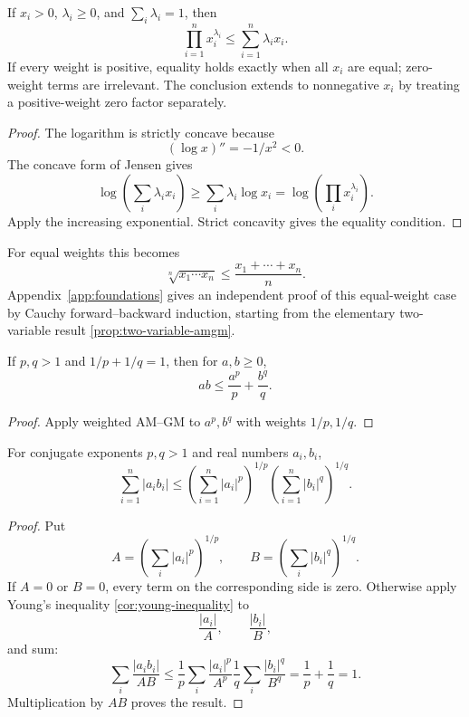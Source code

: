 \begin{corollary}
\label{cor:weighted-amgm}
If \(x_i>0\), \(\lambda_i\geq0\), and
\(\sum_i\lambda_i=1\), then
\[
\boxed{\prod_{i=1}^n x_i^{\lambda_i}
\leq\sum_{i=1}^n\lambda_i x_i.}
\]
If every weight is positive, equality holds exactly when all \(x_i\) are
equal; zero-weight terms are irrelevant. The conclusion extends to
nonnegative \(x_i\) by treating a positive-weight zero factor separately.
\end{corollary}
\begin{proof}
The logarithm is strictly concave because
\[
(\log x)''=-1/x^2<0.
\]
The concave form of Jensen gives
\[
\log\!\left(\sum_i\lambda_i x_i\right)
\geq\sum_i\lambda_i\log x_i
=\log\!\left(\prod_i x_i^{\lambda_i}\right).
\]
Apply the increasing exponential. Strict concavity gives the equality
condition.
\end{proof}
For equal weights this becomes
\[
\sqrt[n]{x_1\cdots x_n}\leq\frac{x_1+\cdots+x_n}{n}.
\]
Appendix~\ref{app:foundations} gives an independent proof of this equal-weight
case by Cauchy forward--backward induction, starting from the elementary
two-variable result \cref{prop:two-variable-amgm}.

\begin{corollary}
\label{cor:young-inequality}
If \(p,q>1\) and \(1/p+1/q=1\), then for \(a,b\geq0\),
\[
\boxed{ab\leq\frac{a^p}{p}+\frac{b^q}{q}.}
\]
\end{corollary}
\begin{proof}
Apply weighted AM--GM to \(a^p,b^q\) with weights \(1/p,1/q\).
\end{proof}

\begin{theorem}
\label{thm:finite-holder}
For conjugate exponents \(p,q>1\) and real numbers \(a_i,b_i\),
\[
\boxed{
\sum_{i=1}^n|a_ib_i|
\leq
\left(\sum_{i=1}^n|a_i|^p\right)^{1/p}
\left(\sum_{i=1}^n|b_i|^q\right)^{1/q}.}
\]
\end{theorem}
\begin{proof}
Put
\[
A=\left(\sum_i|a_i|^p\right)^{1/p},
\qquad
B=\left(\sum_i|b_i|^q\right)^{1/q}.
\]
If \(A=0\) or \(B=0\), every term on the corresponding side is zero.
Otherwise apply Young's inequality \cref{cor:young-inequality} to
\[
\frac{|a_i|}{A},\qquad\frac{|b_i|}{B},
\]
and sum:
\[
\sum_i\frac{|a_ib_i|}{AB}
\leq\frac1p\sum_i\frac{|a_i|^p}{A^p}
 \frac1q\sum_i\frac{|b_i|^q}{B^q}
=\frac1p+\frac1q=1.
\]
Multiplication by \(AB\) proves the result.
\end{proof}

